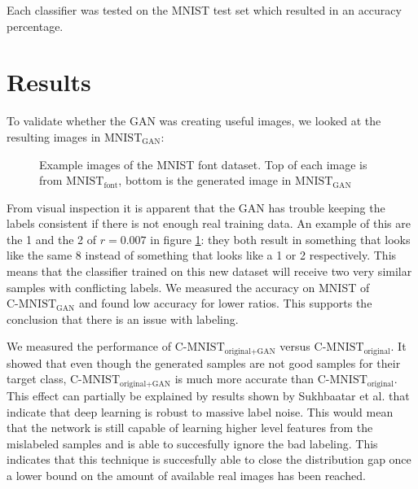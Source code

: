 \documentclass[10pt,twocolumn,letterpaper]{article}
\begin{document}
Each classifier was tested on the MNIST test set which resulted in an accuracy percentage.

\clearpage

\section{Results}

To validate whether the GAN was creating useful images, we looked at the resulting images in $\text{MNIST}_\text{GAN}$:

\begin{figure}[h]
\begin{center}
\end{center}
   \caption{Example images of the MNIST font dataset. Top of each image is from $\text{MNIST}_\text{font}$, bottom is the generated image in $\text{MNIST}_\text{GAN}$ }
\label{fig:results}
\end{figure}

From visual inspection it is apparent that the GAN has trouble keeping the labels consistent if there is not enough real training data. An example of this are the 1 and the 2 of $r = 0.007$ in figure \ref{fig:results}: they both result in something that looks like the same 8 instead of something that looks like a 1 or 2 respectively. This means that the classifier trained on this new dataset will receive two very similar samples with conflicting labels. We measured the accuracy on MNIST of $\text{C-MNIST}_\text{GAN}$ and found low accuracy for lower ratios. This supports the conclusion that there is an issue with labeling.

We measured the performance of $\text{C-MNIST}_\text{original+GAN}$ versus $\text{C-MNIST}_\text{original}$. It showed that even though the generated samples are not good samples for their target class, $\text{C-MNIST}_\text{original+GAN}$ is much more accurate than $\text{C-MNIST}_\text{original}$. This effect can partially be explained by results shown by Sukhbaatar et al. that indicate that deep learning is robust to massive label noise. \cite{Sukhbaatar2014TrainingCN} This would mean that the network is still capable of learning higher level features from the mislabeled samples and is able to succesfully ignore the bad labeling. This indicates that this technique is succesfully able to close the distribution gap once a lower bound on the amount of available real images has been reached.
\end{document}
